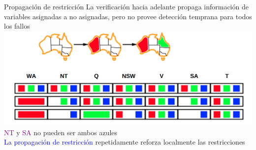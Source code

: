 \begin{frame}{Propagación de restricción}
    La verificación hacia adelante propaga información de variables asignadas a no asignadas, 
    pero no provee detección temprana para todos los fallos
    \includegraphics[scale=0.6]{26_image_cap5pag26.png}
    \\
    \textcolor{Purple}{NT} y \textcolor{Purple}{SA} no pueden ser ambos azules
    \\
    \textcolor{blue}{La propagación de restricción} repetidamente reforza localmente las restricciones 
\end{frame}
    